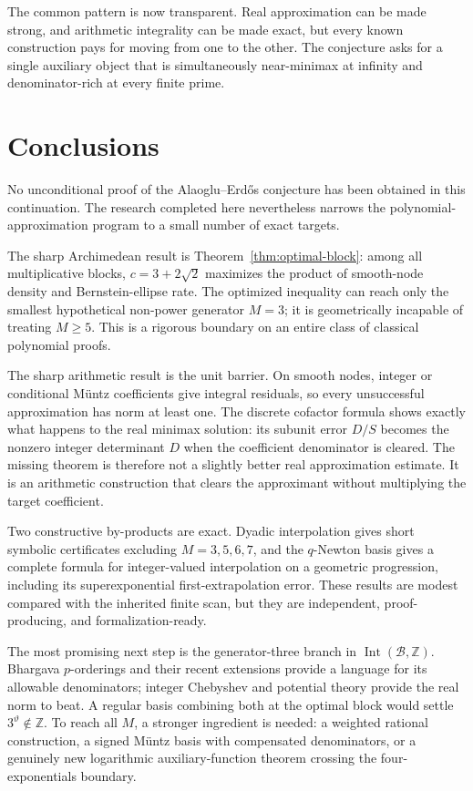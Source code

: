 \documentclass[11pt,oneside]{article}
\theoremstyle{definition}
\theoremstyle{remark}
\newcommand{\Z}{\mathbb Z}
\newcommand{\Bsem}{\mathcal B}
\newcommand{\Int}{\operatorname{Int}}
\newcommand{\thetaq}{\vartheta}
\begin{document}
The common pattern is now transparent.  Real approximation can be made strong, and arithmetic
integrality can be made exact, but every known construction pays for moving from one to the
other.  The conjecture asks for a single auxiliary object that is simultaneously near-minimax
at infinity and denominator-rich at every finite prime.


\section{Conclusions}
\label{sec:conclusion}

No unconditional proof of the Alaoglu--Erd\H{o}s conjecture has been obtained in this
continuation.  The research completed here nevertheless narrows the polynomial-approximation
program to a small number of exact targets.

The sharp Archimedean result is Theorem~\ref{thm:optimal-block}: among all multiplicative
blocks, $c=3+2\sqrt2$ maximizes the product of smooth-node density and Bernstein-ellipse rate.
The optimized inequality can reach only the smallest hypothetical non-power generator
$M=3$; it is geometrically incapable of treating $M\ge5$.  This is a rigorous boundary on an
entire class of classical polynomial proofs.

The sharp arithmetic result is the unit barrier.  On smooth nodes, integer or conditional
M\"untz coefficients give integral residuals, so every unsuccessful approximation has norm at
least one.  The discrete cofactor formula shows exactly what happens to the real minimax
solution: its subunit error $D/S$ becomes the nonzero integer determinant $D$ when the
coefficient denominator is cleared.  The missing theorem is therefore not a slightly better
real approximation estimate.  It is an arithmetic construction that clears the approximant
without multiplying the target coefficient.

Two constructive by-products are exact.  Dyadic interpolation gives short symbolic
certificates excluding $M=3,5,6,7$, and the $q$-Newton basis gives a complete formula for
integer-valued interpolation on a geometric progression, including its superexponential
first-extrapolation error.  These results are modest compared with the inherited finite scan,
but they are independent, proof-producing, and formalization-ready.

The most promising next step is the generator-three branch in
$\Int(\Bsem,\Z)$.  Bhargava $p$-orderings and their recent extensions provide a language for
its allowable denominators; integer Chebyshev and potential theory provide the real norm to
beat.  A regular basis combining both at the optimal block would settle $3^{\thetaq}\notin\Z$.
To reach all $M$, a stronger ingredient is needed: a weighted rational construction, a signed
M\"untz basis with compensated denominators, or a genuinely new logarithmic auxiliary-function
theorem crossing the four-exponentials boundary.
\end{document}
